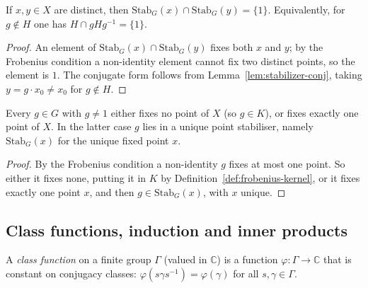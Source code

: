 \begin{lemma}
    \label{lem:trivial-intersection}
    \leanok
    If $x, y \in X$ are distinct, then $\mathrm{Stab}_G(x) \cap
    \mathrm{Stab}_G(y) = \{1\}$. Equivalently, for $g \notin H$ one has
    $H \cap gHg^{-1} = \{1\}$.
\end{lemma}
\begin{proof}
    An element of $\mathrm{Stab}_G(x) \cap \mathrm{Stab}_G(y)$ fixes both $x$ and
    $y$; by the Frobenius condition a non-identity element cannot fix two
    distinct points, so the element is $1$. The conjugate form follows from
    Lemma~\ref{lem:stabilizer-conj}, taking $y = g \cdot x_0 \neq x_0$ for
    $g \notin H$.
\end{proof}

\begin{lemma}
    \label{lem:partition}
    \leanok
    Every $g \in G$ with $g \neq 1$ either fixes no point of $X$ (so $g \in K$),
    or fixes exactly one point of $X$. In the latter case $g$ lies in a unique
    point stabiliser, namely $\mathrm{Stab}_G(x)$ for the unique fixed point $x$.
\end{lemma}
\begin{proof}
    By the Frobenius condition a non-identity $g$ fixes at most one point. So
    either it fixes none, putting it in $K$ by
    Definition~\ref{def:frobenius-kernel}, or it fixes exactly one point $x$,
    and then $g \in \mathrm{Stab}_G(x)$, with $x$ unique.
\end{proof}

\subsection{Class functions, induction and inner products}

\begin{definition}
    \label{def:class-function}
    \leanok
    A \emph{class function} on a finite group $\Gamma$ (valued in $\mathbb{C}$) is
    a function $\varphi : \Gamma \to \mathbb{C}$ that is constant on conjugacy
    classes: $\varphi(s\gamma s^{-1}) = \varphi(\gamma)$ for all
    $s, \gamma \in \Gamma$.
\end{definition}

